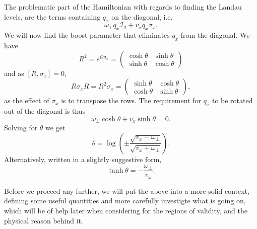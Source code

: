 The problematic part of the Hamiltonian with regards to finding the Landau levels, are the terms containing \(q_{x}\) on the diagonal, i.e.
\[
  \omega _{\perp} q_{x} \mathcal{I}_{2} + v_{x} q_{x} \sigma _{x}.
\]
We will now find the boost parameter that eliminates \(q_{x}\) from the diagonal.
We have
\begin{equation}
  \label{eq:9}
  R^{2} = e^{\Theta \sigma _{x} } =
  \begin{pmatrix}
    \cosh \theta & \sinh \theta \\
    \sinh \theta & \cosh \theta
  \end{pmatrix}
\end{equation}
and as $[R, \sigma_{x}] = 0$,
\begin{equation}
  \label{eq:10}
  R \sigma _{x} R =  R^{2} \sigma _{x} =
  \begin{pmatrix}
    \sinh \theta & \cosh \theta \\
    \cosh \theta & \sinh \theta
  \end{pmatrix},
\end{equation}
as the effect of \(\sigma _{x}\) is to transpose the rows.
The requirement for \(q_{x}\) to be rotated out of the diagonal is thus
\begin{equation}
  \label{eq:11}
  \omega _{\perp} \cosh \theta + v_{x} \sinh \theta = 0.
\end{equation}
Solving for \(\theta \) we get
\begin{equation}
  \label{eq:12}
  \theta = \log (
  \pm \frac{\sqrt{v_{x} - \omega _{\perp}}}{\sqrt{v_{x} + \omega _{\perp}}}
  ).
\end{equation}
Alternatively, written in a slightly suggestive form,
\begin{equation}
  \label{eq:13}
  \tanh \theta =
  - \frac{\omega _{\perp}}{v_{x}}.
\end{equation}

Before we proceed any further, we will put the above into a more solid context, defining some useful quantities and more carefully investigte what is going on, which will be of help later when considering for the regions of validity, and the physical reason behind it.


